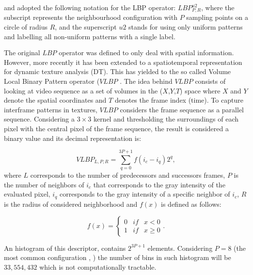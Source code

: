 \cite{ahonen2004face} and \cite{ahonen2006face} adopted the following notation for the LBP operator: $LBP_{P,R}^{u2}$, where the subscript represents the neighbourhood configuration with $P$ sampling points on a circle of radius $R$, and the superscript $u2$ stands for using only uniform patterns and labelling all non-uniform patterns with a single label.





The original $LBP$ operator was defined to only deal with spatial information. However, more recently it has been extended to a spatiotemporal representation for dynamic texture analysis (DT). This has yielded to the so called Volume Local Binary Pattern operator ($VLBP$ \citep{zhao2007dynamic}. The idea behind $VLBP$ consists of looking at video sequence as a set of volumes in the ($X$,$Y$,$T$) space where $X$ and $Y$ denote the spatial coordinates and $T$ denotes the frame index (time). To capture interframe patterns in textures, $VLBP$ considers the frame sequence as a parallel sequence. Considering a $3 \times 3$ kernel and thresholding the surroundings of each pixel with the central pixel of the frame sequence, the result is considered a binary value and its decimal representation is:

\begin{equation}
\label{eq:VLBP}
VLBP_{L,P,R} =  \sum_{q=0}^{3P+1}f(i_c - i_q)2^q,
\end{equation}
where $L$ corresponds to the number of predecessors and successors frames, $P$ is the number of neighbors of $i_c$ that corresponds to the gray intensity of the evaluated pixel, $i_q$ corresponds to the gray intensity of a specific neighbor of $i_c$, $R$ is the radius of considered neighborhood and $f(x)$ is defined as follows:

\begin{equation}
f(x)  =
\left\lbrace 
	\begin{array}{ccc}
		0 & if & x<0 \\
		1 & if & x\geq0 
	\end{array}. \right.
\label{eq:fx}
\end{equation}

An histogram of this descriptor, contains $2^{3P+1}$ elements. Considering $P=8$ (the most common configuration \cite{ChingovskaBIOSIG2012}, \cite{maatta2011face} \cite{ahonen2006face}) the number of bins in such histogram will be $33,554,432$ which is not computationally tractable.

